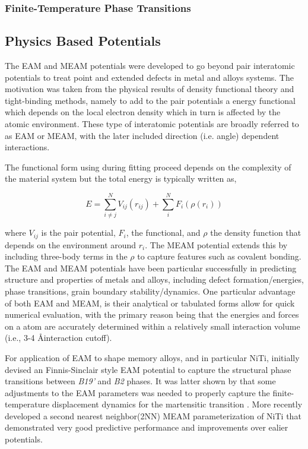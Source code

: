 \documentclass[preprint,colorlinks=true,linkcolor=black,citecolor=black]{elsarticle}
\begin{document}
\subsubsection{Finite-Temperature Phase Transitions}

\subsection{Physics Based Potentials}
\label{sec:physics_potentials}

The EAM and MEAM potentials were developed to go beyond pair
interatomic potentials to treat point and extended defects in metal
and alloys systems. The motivation was taken from the physical results
of density functional theory and tight-binding methods, namely to add
to the pair potentials a energy functional which depends on the local
electron density which in turn is affected by the atomic
environment. These type of interatomic potentials are broadly referred
to as EAM or MEAM, with the later included direction (i.e. angle)
dependent interactions. \par

The functional form using during fitting proceed depends on the
complexity of the material system but the total energy is typically
written as,

\begin{equation}
  \label{eq:eam}
  E = \sum_{i\neq j}^N V_{ij}(r_{ij}) + \sum_i^N F_i\left(\rho(r_i)\right)
\end{equation}

where $V_{ij}$ is the pair potential, $F_i$, the functional, and
$\rho$ the density function that depends on the environment around
$r_i$. The MEAM potential extends this by including three-body terms
in the $\rho$ to capture features such as covalent bonding. The EAM
and MEAM potentials have been particular successfully in predicting
structure and properties of metals and alloys, including defect
formation/energies, phase transitions, grain boundary
stability/dynamics. One particular advantage of both EAM and MEAM, is
their analytical or tabulated forms allow for quick numerical
evaluation, with the primary reason being that the energies and forces
on a atom are accurately determined within a relatively small
interaction volume (i.e., 3-4 \AA interaction cutoff).  \par

For application of EAM to shape memory alloys, and in particular NiTi,
\citet{Mutter2010} initially devised an Finnis-Sinclair style EAM
potential to capture the structural phase transitions between
\textit{B19'} and \textit{B2} phases. It was latter shown by
\cite{Zhong2011} that some adjustments to the EAM parameters was
needed to properly capture the finite-temperature displacement
dynamics for the martensitic transition \cite{Gur2017}. More recently
\citet{Ko2015} developed a second nearest neighbor(2NN) MEAM
parameterization of NiTi that demonstrated very good predictive
performance and improvements over ealier potentials.
\end{document}
